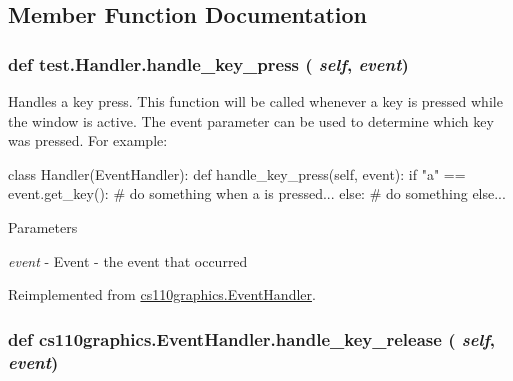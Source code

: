 \subsection{Member Function Documentation}
\hypertarget{classtest_1_1Handler_a3d418670cfafce344b8b7155b4df438e}{
\subsubsection[{handle\_\-key\_\-press}]{\setlength{\rightskip}{0pt plus 5cm}def test.Handler.handle\_\-key\_\-press ( {\em self}, \/   {\em event})}}
\label{classtest_1_1Handler_a3d418670cfafce344b8b7155b4df438e}


Handles a key press. This function will be called whenever a key is pressed while the window is active. The event parameter can be used to determine which key was pressed. For example: 
\begin{DoxyCode}
 class Handler(EventHandler):
     def handle_key_press(self, event):
         if "a" == event.get_key():
             # do something when a is pressed...
         else:
             # do something else...
\end{DoxyCode}
 
\begin{DoxyParams}{Parameters}
\item[{\em event}]-\/ Event -\/ the event that occurred \end{DoxyParams}


Reimplemented from \hyperlink{classcs110graphics_1_1EventHandler_af3fb3531d0b23f1430a830586cd07906}{cs110graphics.EventHandler}.\hypertarget{classcs110graphics_1_1EventHandler_a2849f60251baa44252992162521f2473}{
\subsubsection[{handle\_\-key\_\-release}]{\setlength{\rightskip}{0pt plus 5cm}def cs110graphics.EventHandler.handle\_\-key\_\-release ( {\em self}, \/   {\em event})}}
\label{classcs110graphics_1_1EventHandler_a2849f60251baa44252992162521f2473}


